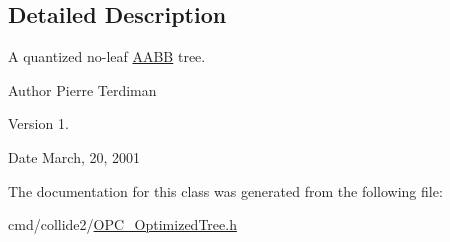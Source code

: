\subsection{Detailed Description}
A quantized no-\/leaf \hyperlink{classAABB}{A\+A\+BB} tree.

\begin{DoxyAuthor}{Author}
Pierre Terdiman 
\end{DoxyAuthor}
\begin{DoxyVersion}{Version}
1. 
\end{DoxyVersion}
\begin{DoxyDate}{Date}
March, 20, 2001 
\end{DoxyDate}


The documentation for this class was generated from the following file\+:\begin{DoxyCompactItemize}
\item 
cmd/collide2/\hyperlink{OPC__OptimizedTree_8h}{O\+P\+C\+\_\+\+Optimized\+Tree.\+h}\end{DoxyCompactItemize}
